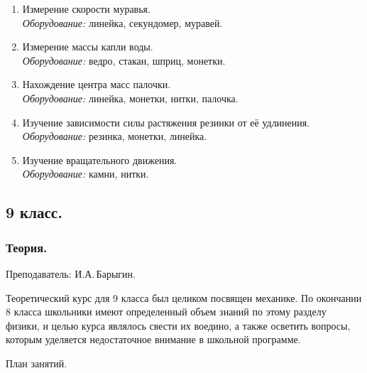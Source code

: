 \documentclass[12pt,a4paper,oneside,draft]{scrartcl}
\begin{document}
\begin{enumerate}
\item Измерение скорости муравья.  \\ \textit{Оборудование:} линейка,
  секундомер, муравей.
\item Измерение массы капли воды. \\ \textit{Оборудование:} ведро,
  стакан, шприц, монетки.
\item Нахождение центра масс палочки. \\ \textit{Оборудование:}
  линейка, монетки, нитки, палочка.
\item Изучение зависимости силы растяжения резинки от её удлинения. \\
  \textit{Оборудование:} резинка, монетки, линейка.
\item Изучение вращательного движения. \\ \textit{Оборудование:}
  камни, нитки. 
\end{enumerate}

\subsection{9 класс.}
\label{sec:daily_9}

\subsubsection{Теория.}
\label{sec:daily_9_th}

\textsf{Преподаватель: И.А.\,Барыгин.}
\smallskip

Теоретический курс для 9 класса был целиком посвящен механике. По
окончании 8 класса школьники имеют определенный объем знаний по этому
разделу физики, и целью курса являлось свести их воедино, а также
осветить вопросы, которым уделяется недостаточное внимание в школьной
программе.

\begin{center}
  \textsf{План занятий.}
\end{center}
\end{document}
